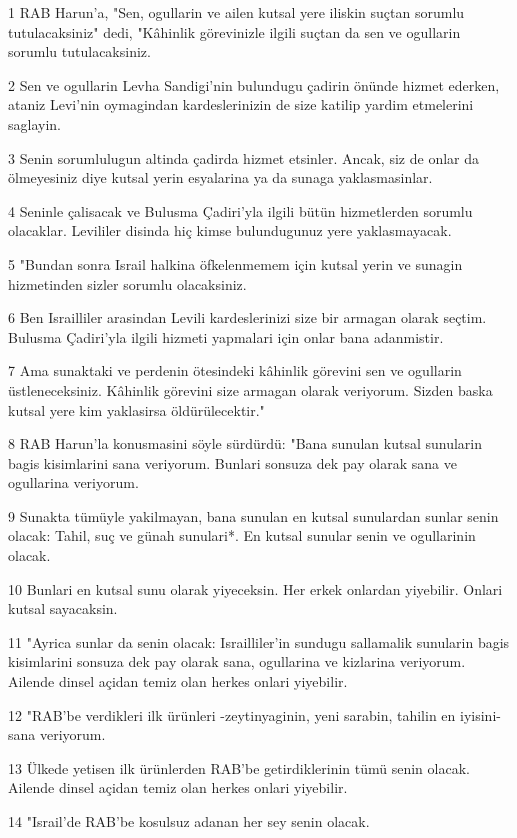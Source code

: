 \par 1 RAB Harun'a, "Sen, ogullarin ve ailen kutsal yere iliskin suçtan sorumlu tutulacaksiniz" dedi, "Kâhinlik görevinizle ilgili suçtan da sen ve ogullarin sorumlu tutulacaksiniz.
\par 2 Sen ve ogullarin Levha Sandigi'nin bulundugu çadirin önünde hizmet ederken, ataniz Levi'nin oymagindan kardeslerinizin de size katilip yardim etmelerini saglayin.
\par 3 Senin sorumlulugun altinda çadirda hizmet etsinler. Ancak, siz de onlar da ölmeyesiniz diye kutsal yerin esyalarina ya da sunaga yaklasmasinlar.
\par 4 Seninle çalisacak ve Bulusma Çadiri'yla ilgili bütün hizmetlerden sorumlu olacaklar. Levililer disinda hiç kimse bulundugunuz yere yaklasmayacak.
\par 5 "Bundan sonra Israil halkina öfkelenmemem için kutsal yerin ve sunagin hizmetinden sizler sorumlu olacaksiniz.
\par 6 Ben Israilliler arasindan Levili kardeslerinizi size bir armagan olarak seçtim. Bulusma Çadiri'yla ilgili hizmeti yapmalari için onlar bana adanmistir.
\par 7 Ama sunaktaki ve perdenin ötesindeki kâhinlik görevini sen ve ogullarin üstleneceksiniz. Kâhinlik görevini size armagan olarak veriyorum. Sizden baska kutsal yere kim yaklasirsa öldürülecektir."
\par 8 RAB Harun'la konusmasini söyle sürdürdü: "Bana sunulan kutsal sunularin bagis kisimlarini sana veriyorum. Bunlari sonsuza dek pay olarak sana ve ogullarina veriyorum.
\par 9 Sunakta tümüyle yakilmayan, bana sunulan en kutsal sunulardan sunlar senin olacak: Tahil, suç ve günah sunulari*. En kutsal sunular senin ve ogullarinin olacak.
\par 10 Bunlari en kutsal sunu olarak yiyeceksin. Her erkek onlardan yiyebilir. Onlari kutsal sayacaksin.
\par 11 "Ayrica sunlar da senin olacak: Israilliler'in sundugu sallamalik sunularin bagis kisimlarini sonsuza dek pay olarak sana, ogullarina ve kizlarina veriyorum. Ailende dinsel açidan temiz olan herkes onlari yiyebilir.
\par 12 "RAB'be verdikleri ilk ürünleri -zeytinyaginin, yeni sarabin, tahilin en iyisini- sana veriyorum.
\par 13 Ülkede yetisen ilk ürünlerden RAB'be getirdiklerinin tümü senin olacak. Ailende dinsel açidan temiz olan herkes onlari yiyebilir.
\par 14 "Israil'de RAB'be kosulsuz adanan her sey senin olacak.
